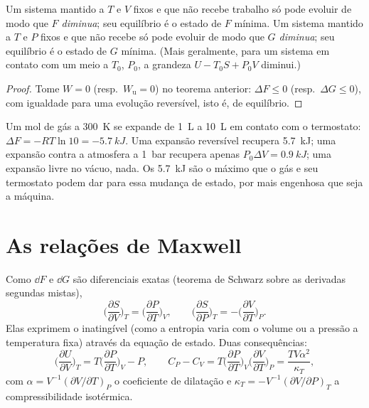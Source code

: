 \begin{theorem}\label{thm:b2:thermodynamic-potentials:criteria}
Um sistema mantido a $T$ e $V$ fixos e que não recebe trabalho só pode
evoluir de modo que \emph{$F$ diminua}; seu equilíbrio é o estado de
$F$ mínima. Um sistema mantido a $T$ e $P$ fixos e que não recebe  só pode evoluir de modo que \emph{$G$ diminua}; seu equilíbrio é
o estado de $G$ mínima. (Mais geralmente, para um sistema em contato com
um meio a $T_0$, $P_0$, a grandeza $U - T_0S + P_0V$ diminui.)
\end{theorem}

\begin{proof}
Tome $W = 0$ (resp.\ $W_{\text{u}} = 0$) no teorema anterior: $\Delta F
\le 0$ (resp.\ $\Delta G \le 0$), com igualdade para uma evolução reversível,
isto é, de equilíbrio.
\end{proof}

\begin{example}\label{ex:b2:thermodynamic-potentials:expansion}
Um mol de gás a \qty{300}{K} se expande de \qty{1}{L} a \qty{10}{L} em
contato com o termostato: $\Delta F = -RT\ln 10 = \qty{-5.7}{kJ}$. Uma
expansão reversível recupera \qty{5.7}{kJ}; uma expansão contra a
atmosfera a \qty{1}{bar} recupera apenas $P_0\Delta V = \qty{0.9}{kJ}$; uma
expansão livre no vácuo, nada. Os \qty{5.7}{kJ} são o máximo que
o gás e seu termostato podem dar para essa mudança de estado, por mais
engenhosa que seja a máquina.
\end{example}

\section{As relações de Maxwell}

\begin{theorem}\label{thm:b2:thermodynamic-potentials:maxwell}
Como $\dd F$ e $\dd G$ são diferenciais exatas (teorema de Schwarz
sobre as derivadas segundas mistas),
\[
\Big(\frac{\partial S}{\partial V}\Big)_T = \Big(\frac{\partial P}{\partial T}\Big)_V,
\qquad
\Big(\frac{\partial S}{\partial P}\Big)_T = -\Big(\frac{\partial V}{\partial T}\Big)_P .
\]
Elas exprimem o inatingível (como a entropia varia com o volume ou
a pressão a temperatura fixa) através da equação de estado. Duas
consequências:
\[
\Big(\frac{\partial U}{\partial V}\Big)_T = T\Big(\frac{\partial P}{\partial T}\Big)_V - P,
\qquad
C_P - C_V = T\Big(\frac{\partial P}{\partial T}\Big)_V\Big(\frac{\partial V}{\partial T}\Big)_P
= \frac{TV\alpha^2}{\kappa_T} ,
\]
com $\alpha = V^{-1}(\partial V/\partial T)_P$ o coeficiente de dilatação e
$\kappa_T = -V^{-1}(\partial V/\partial P)_T$ a compressibilidade isotérmica.
\end{theorem}

